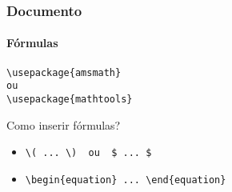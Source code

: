 \begin{frame}[fragile]
\frametitle{Documento}
\framesubtitle{Fórmulas}
  \begin{verbatim}
\usepackage{amsmath}
ou
\usepackage{mathtools}
  \end{verbatim}

  Como inserir fórmulas?
  \begin{itemize}
  \item \begin{verbatim}
\( ... \)  ou  $ ... $
        \end{verbatim}
  \item \begin{verbatim}
\begin{equation} ... \end{equation}
        \end{verbatim}
  \end{itemize}
\end{frame}


